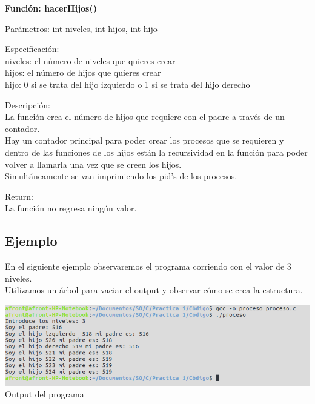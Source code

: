 \documentclass[10pt,a4paper]{article}
\begin{document}
\begin{flushleft}
\textbf{Función: hacerHijos()} 
\end{flushleft}

\begin{flushleft}
Parámetros: int niveles, int hijos, int hijo\\
\end{flushleft}
\begin{flushleft}
Especificación: \\
niveles: el número de niveles que quieres crear \\
hijos: el número de hijos que quieres crear \\
hijo: 0 si se trata del hijo izquierdo o 1 si se trata del hijo derecho \\
\end{flushleft}

\begin{flushleft}
Descripción:\\
La función crea el número de hijos que requiere con el padre a través de un contador.\\
Hay un contador principal para poder crear los procesos que se requieren y dentro de las funciones de los hijos están la recursividad en la función para poder volver a llamarla una vez que se creen los hijos. \\
Simultáneamente se van imprimiendo los pid's de los procesos.
\end{flushleft}

\begin{flushleft}
Return: \\
La función no regresa ningún valor.
\end{flushleft}

\subsection{Ejemplo}

\begin{flushleft}
En el siguiente ejemplo observaremos el programa corriendo con el valor de 3 niveles. \\
Utilizamos un árbol para vaciar el output y observar cómo se crea la estructura.
\end{flushleft}

\begin{center}
\includegraphics[scale=0.3]{example.png} \\
Output del programa
\end{center}
\end{document}
